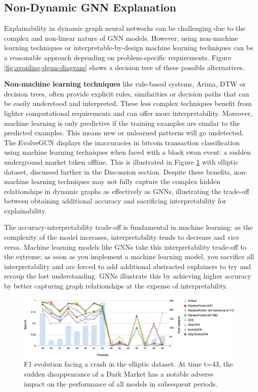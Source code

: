 \subsection{Non-Dynamic GNN Explanation}
Explainability in dynamic graph neural networks can be challenging due to the complex and non-linear nature of GNN models. However, using non-machine learning techniques or interpretable-by-design machine learning techniques can be a reasonable approach depending on problem-specific requirements. Figure \ref{fig:avoiding-dgnn-diagram} shows a decision tree of these possible alternatives.

\textbf{Non-machine learning techniques} like rule-based systems, Arima, DTW or decision trees, often provide explicit rules, similarities or decision paths that can be easily understood and interpreted. These less complex techniques benefit from lighter computational requirements and can offer more interpretability. Moreover, machine learning is only predictive if the training examples are similar to the predicted examples. This means new or unlearned patterns will go undetected. The EvolveGCN\cite{pareja_evolvegcn_2019} displays the inaccuracies in bitcoin transaction classification using machine learning techniques when faced with a black swan event: a sudden underground market taken offline. This is illustrated in Figure \ref{fig:elliptic-fraud-f1} with elliptic dataset, discussed further in the Discussion section. Despite these benefits, non-machine learning techniques may not fully capture the complex hidden relationships in dynamic graphs as effectively as GNNs, illustrating the trade-off between obtaining additional accuracy and sacrificing interpretability for explainability.

The accuracy-interpretability trade-off is fundamental in machine learning: as the complexity of the model increases, interpretability tends to decrease and vice versa. Machine learning models like GNNs take this interpretability trade-off to the extreme; as soon as you implement a machine learning model, you sacrifice all interpretability and are forced to add additional abstracted explainers to try and recoup the lost understanding. GNNs illustrate this by achieving higher accuracy by better capturing graph relationships at the expense of interpretability.

\begin{figure}
    \centering 
    \includegraphics[width=\textwidth]{images/elliptic-fraud-f1.png}
    \caption{F1 evolution facing a crash in the elliptic dataset. At time t=43, the sudden disappearance of a Dark Market has a notable adverse impact on the performance of all models in subsequent periods.\cite{bellei_elliptic_2019}}
    \label{fig:elliptic-fraud-f1}
\end{figure}

